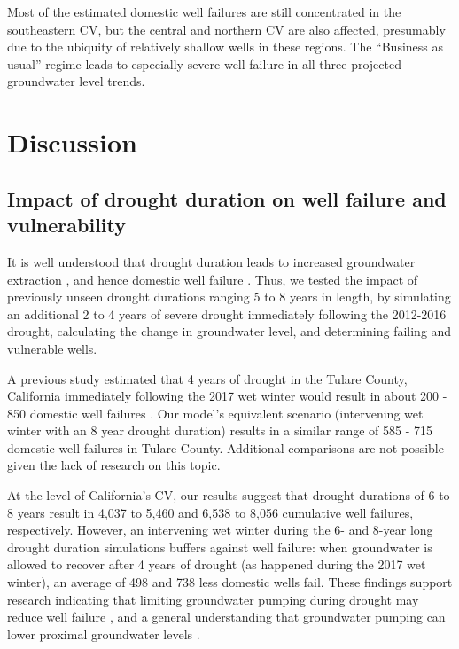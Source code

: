 Most of the estimated domestic well failures are still concentrated in the southeastern CV, but the central and northern CV are also affected, presumably due to the ubiquity of relatively shallow wells in these regions. The ``Business as usual'' regime leads to especially severe well failure in all three projected groundwater level trends.



\section{Discussion}


\subsection{Impact of drought duration on well failure and vulnerability}

It is well understood that drought duration leads to increased groundwater extraction \citep{Hanak2011, Medellin-azuara2016}, and hence domestic well failure \citep{Perrone2017, Feinstein2017}. Thus, we tested the impact of previously unseen drought durations ranging 5 to 8 years in length, by simulating an additional 2 to 4 years of severe drought immediately following the 2012-2016 drought, calculating the change in groundwater level, and determining failing and vulnerable wells. 

A previous study estimated that 4 years of drought in the Tulare County, California immediately following the 2017 wet winter would result in about 200 - 850 domestic well failures \citep{Gailey2019}. 
Our model's equivalent scenario (intervening wet winter with an 8 year drought duration) results in a similar range of 585 - 715 domestic well failures in Tulare County. Additional comparisons are not possible given the lack of research on this topic.  

At the level of California's CV, our results suggest that drought durations of 6 to 8 years result in 4,037 to 5,460 and 6,538 to 8,056 cumulative well failures, respectively. However, an intervening wet winter during the 6- and 8-year long drought duration simulations buffers against well failure: when groundwater is allowed to recover after 4 years of drought (as happened during the 2017 wet winter), an average of 498 and 738 less domestic wells fail. These findings support research indicating that limiting groundwater pumping during drought may reduce well failure \citep{Hanak2019, Gailey2019}, and a general understanding that groundwater pumping can lower proximal groundwater levels \citep{theis1935relation}.  

